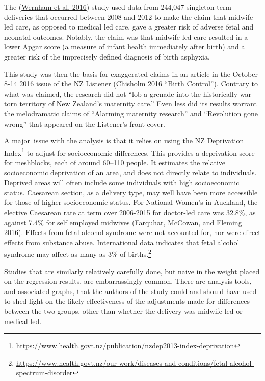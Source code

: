 \documentclass[
  10pt,
  b5paper]{book}
\begin{document}
The (\protect\hyperlink{ref-wernham_EtAl_2016}{Wernham et al. 2016}) study used data from 244,047 singleton
term deliveries that occurred between 2008 and 2012 to make the
claim that midwife led care, as opposed to medical led care, gave a
greater risk of adverse fetal and neonatal outcomes. Notably, the
claim was that midwife led care resulted in a lower Apgar score
(a measure of infant health immediately after birth) and a greater
risk of the imprecisely defined diagnosis of birth asphyxia.

This study was then the basis for exaggerated claims in an article
in the October 8-14 2016 issue of the NZ Listener
(\protect\hyperlink{ref-chisholm_2016}{Chisholm 2016} {``Birth Control''}). Contrary to what was
claimed, the research did not
``lob a grenade into the historically war-torn territory of
New Zealand's maternity care.''
Even less did its results warrant the melodramatic claims of
``Alarming maternity research'' and ``Revolution gone wrong'' that
appeared on the Listener's front cover.

A major~issue with the analysis is that it relies on using the NZ
Deprivation Index\footnote{
  \url{https://www.health.govt.nz/publication/nzdep2013-index-deprivation}}
to adjust for socioeconomic differences. This provides a deprivation
score for meshblocks, each of around 60--110 people. It estimates the
relative socioeconomic deprivation of an area, and does not directly
relate to individuals. Deprived areas will often include some
individuals with high socioeconomic status. Caesarean section, as a
delivery type, may well have been more accessible for those of
higher socioeconomic status. For National Women's in Auckland,
the elective Caesarean rate at term over 2006-2015 for doctor-led
care was 32.8\%, as against 7.4\% for self employed midwives
(\protect\hyperlink{ref-farquhar2016letter}{Farquhar, McCowan, and Fleming 2016}). Effects from fetal alcohol syndrome were
not accounted for, nor were direct effects from substance abuse.
International data indicates that fetal alcohol syndrome may
affect as many as 3\% of
births.\footnote{\url{https://www.health.govt.nz/our-work/diseases-and-conditions/fetal-alcohol-spectrum-disorder}}

Studies that are similarly relatively carefully done,
but naive in the weight placed on the regression results,
are embarrassingly common. There are analysis tools, and
associated graphs, that the authors of the study could
and should have used to shed light on the likely
effectiveness of the adjustments made for differences
between the two groups, other than whether the delivery
was midwife led or medical led.
\end{document}
